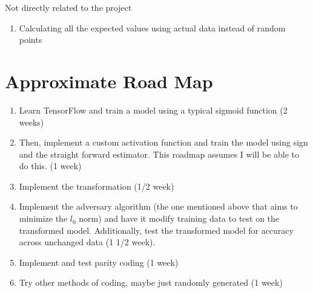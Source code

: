 \documentclass{article}
\begin{document}
Not directly related to the project

\begin{enumerate}

\item Calculating all the expected values using actual data instead of random points

\end{enumerate}

\section{Approximate Road Map}

\begin{enumerate}

\item Learn TensorFlow and train a model using a typical sigmoid function (2 weeks)

\item Then, implement a custom activation function and train the model using sign and the straight forward estimator. This roadmap assumes I will be able to do this. (1 week)

\item Implement the transformation (1/2 week)

\item Implement the adversary algorithm (the one mentioned above that aims to minimize the $l_0$ norm) and have it modify training data to test on the transformed model. Additionally, test the transformed model for accuracy across unchanged data (1 1/2 week).

\item Implement and test parity coding (1 week)

\item Try other methods of coding, maybe just randomly generated (1 week)

\end{enumerate}
\end{document}
